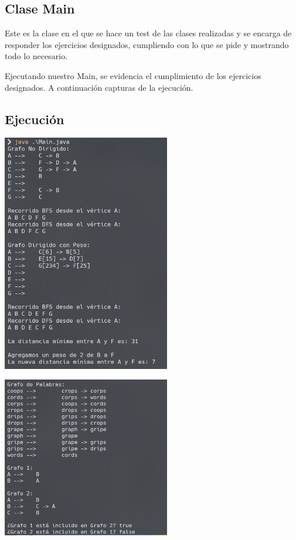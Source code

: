\documentclass{article}
\begin{document}
            \subsection{Clase Main}

                Este es la clase en el que se hace un test de las clases realizadas y se encarga de responder los ejercicios designados, cumpliendo con lo que se pide y mostrando todo lo necesario.
            
                

                Ejecutando nuestro Main, se evidencia el cumplimiento de los ejercicios designados. A continuación capturas de la ejecución.

            \subsection{Ejecución}
                \begin{center}
                    \includegraphics[width=0.55\textwidth]{img/cap1.png}
                \end{center}

                \begin{center}
                    \includegraphics[width=0.55\textwidth]{img/cap2.png}
                \end{center}
\end{document}
